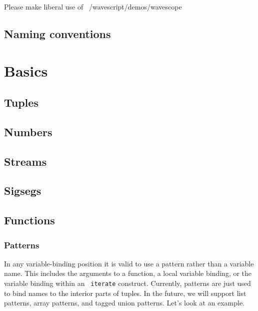 Please make liberal use of ~/wavescript/demos/wavescope

\section{Naming conventions}


\chapter{Basics}

\section{Tuples}

\section{Numbers}



\section{Streams}

\section{Sigsegs}

\section{Functions}

\subsection*{Patterns}

In any variable-binding position it is valid to use a pattern rather
than a variable name.  This includes the arguments to a function, a
local variable binding, or the variable binding within an {\tt
  iterate} construct.  Currently, patterns are just used to bind names
to the interior parts of tuples.  In the future, we will support list
patterns, array patterns, and tagged union patterns.  Let's look at an example.

